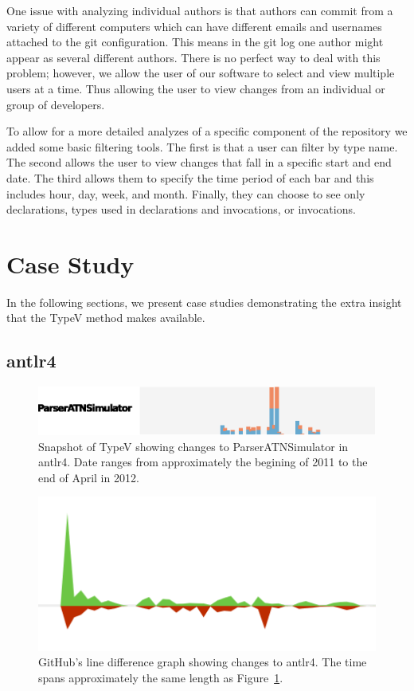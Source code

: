 \documentclass[conference]{IEEEtran}
\begin{document}
One issue with analyzing individual authors is that authors can commit from a variety of different computers which can have different emails and usernames attached to the git configuration. This means in the git log one author might appear as several different authors. There is no perfect way to deal with this problem; however, we allow the user of our software to select and view multiple users at a time. Thus allowing the user to view changes from an individual or group of developers.

To allow for a more detailed analyzes of a specific component of the repository we added some basic filtering tools. The first is that a user can filter by type name. The second allows the user to view changes that fall in a specific start and end date. The third allows them to specify the time period of each bar and this includes hour, day, week, and month. Finally, they can choose to see only declarations, types used in declarations and invocations, or invocations.

\section{Case Study}

In the following sections, we present case studies demonstrating the extra insight that the TypeV method makes available.

\subsection{antlr4}

\begin{figure}[!ht]
\centering
\includegraphics[width=\columnwidth]{ParserATNSimulator}
\caption{Snapshot of TypeV showing changes to ParserATNSimulator in antlr4. Date ranges from approximately the begining of 2011 to the end of April in 2012.}
\label{fig:parser1}
\end{figure}

\begin{figure}[!ht]
\centering
\includegraphics[width=\columnwidth]{Antlr4-GH-Lines-ParserATNSimulator}
\caption{GitHub's line difference graph showing changes to antlr4. The time spans approximately the same length as Figure~\ref{fig:parser1}.}
\label{fig:parser2}
\end{figure}
\end{document}
